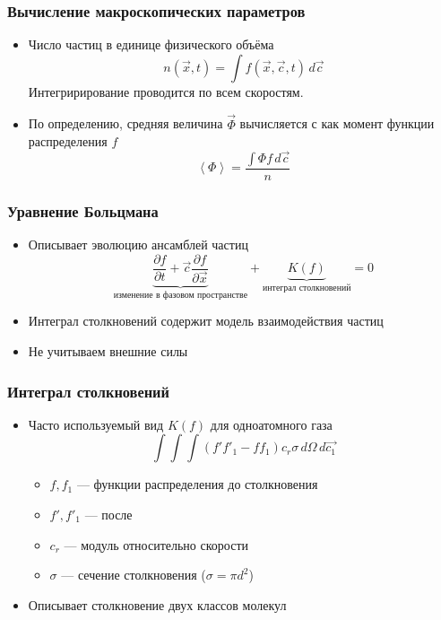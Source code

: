 \documentclass[onlymath]{beamer}
\newcommand\avg[1]{\left\langle{#1}\right\rangle}
\newcommand{\pardiff}[2]{\frac{\partial{#1}}{\partial{#2}}}
\begin{document}
\begin{frame}
  \frametitle{Вычисление макроскопических параметров}
  \begin{itemize}
  \item Число частиц в единице физического объёма
    \begin{equation*}
      n(\vec{x}, t) = \int f(\vec{x}, \vec{c}, t)\,d\vec{c}
    \end{equation*}
    Интегририрование проводится по всем скоростям.
  \item По определению, средняя величина $\vec{\Phi}$ вычисляется с
    как момент функции распределения $f$
    \begin{equation*}
      \avg{\Phi} = \frac{\int{\Phi f \,d\vec{c}}}{n}
    \end{equation*}
  \end{itemize}
\end{frame}

\begin{frame}
  \frametitle{Уравнение Больцмана}
  \begin{itemize}
  \item Описывает эволюцию ансамблей частиц
    \begin{equation*}
      \underbrace{\pardiff{f}{t} +
        \vec{c} \pardiff{f}{\vec{x}}}_{\text{изменение в фазовом
          пространстве}} + 
      \underbrace{K(f)}_{\text{интеграл столкновений}} = 0
    \end{equation*}
  \item Интеграл столкновений содержит модель взаимодействия частиц
  \item Не учитываем внешние силы
  \end{itemize}
\end{frame}

\begin{frame}
  \frametitle{Интеграл столкновений}
  \begin{itemize}
  \item Часто используемый вид $K(f)$ для одноатомного газа
    \begin{equation*}
      \int\int\int(f'f'_1-f f_1) {c_r \sigma \,d\Omega\,d\vec{c_1}}
    \end{equation*}
    \begin{itemize}
    \item $f, f_1$ — функции распределения до столкновения
    \item $f', f'_1$ — после
    \item $c_r$ — модуль относительно скорости
    \item $\sigma$ — сечение столкновения ($\sigma = \pi d^2$)
    \end{itemize}
  \item Описывает столкновение двух классов молекул
  \end{itemize}
\end{frame}
\end{document}
